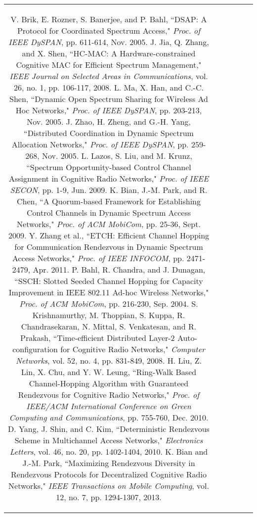 \documentclass[journal]{IEEEtran}
\begin{document}
\begin{table*}
\begin{tabular}{|c|c|c|c|c|c|}
{\begin{thebibliography}{1}
\bibitem{IEEEhowto:kopka}
V. Brik, E. Rozner, S. Banerjee, and P. Bahl, ``DSAP: A Protocol for Coordinated Spectrum Access," \emph{Proc. of IEEE DySPAN}, pp. 611-614, Nov. 2005.
\bibitem{IEEEhowto:kopka}
J. Jia, Q. Zhang, and X. Shen, ``HC-MAC: A Hardware-constrained Cognitive MAC for Efficient Spectrum Management," \emph{IEEE Journal on Selected Areas in Communications}, vol. 26, no. 1, pp. 106-117, 2008.
\bibitem{IEEEhowto:kopka}
L. Ma, X. Han, and C.-C. Shen, ``Dynamic Open Spectrum Sharing for Wireless Ad Hoc Networks," \emph{Proc. of IEEE DySPAN}, pp. 203-213, Nov. 2005.
\bibitem{IEEEhowto:kopka}
J. Zhao, H. Zheng, and G.-H. Yang, ``Distributed Coordination in Dynamic Spectrum Allocation Networks," \emph{Proc. of IEEE DySPAN}, pp. 259-268, Nov. 2005.
\bibitem{IEEEhowto:kopka}
L. Lazos, S. Liu, and M. Krunz, ``Spectrum Opportunity-based Control Channel Assignment in Cognitive Radio Networks," \emph{Proc. of IEEE SECON}, pp. 1-9, Jun. 2009.
\bibitem{IEEEhowto:kopka}
K. Bian, J.-M. Park, and R. Chen, ``A Quorum-based Framework for Establishing Control Channels in Dynamic Spectrum Access Networks," \emph{Proc. of ACM MobiCom}, pp. 25-36, Sept. 2009.
\bibitem{IEEEhowto:kopka}
Y. Zhang et al., ``ETCH: Efficient Channel Hopping for Communication Rendezvous in Dynamic Spectrum Access Networks," \emph{Proc. of IEEE INFOCOM}, pp. 2471-2479, Apr. 2011.
\bibitem{IEEEhowto:kopka}
P. Bahl, R. Chandra, and J. Dunagan, ``SSCH: Slotted Seeded Channel Hopping for Capacity Improvement in IEEE 802.11 Ad-hoc Wireless Networks," \emph{Proc. of ACM MobiCom}, pp. 216-230, Sep. 2004.
\bibitem{IEEEhowto:kopka}
S. Krishnamurthy, M. Thoppian, S. Kuppa, R. Chandrasekaran, N. Mittal, S. Venkatesan, and R. Prakash, ``Time-efficient Distributed Layer-2 Auto-configuration for Cognitive Radio Networks," \emph{Computer Networks}, vol. 52, no. 4, pp. 831-849, 2008.
\bibitem{IEEEhowto:kopka}
H. Liu,  Z. Lin,  X. Chu, and Y. W. Leung, ``Ring-Walk Based Channel-Hopping Algorithm with Guaranteed Rendezvous for Cognitive Radio Networks," \emph{Proc. of IEEE/ACM International Conference on Green Computing and Communications}, pp. 755-760, Dec. 2010.
\bibitem{IEEEhowto:kopka}
D. Yang, J. Shin, and C. Kim, ``Deterministic Rendezvous Scheme in Multichannel Access Networks," \emph{Electronics Letters}, vol. 46, no. 20, pp. 1402-1404, 2010.
\bibitem{IEEEhowto:kopka}
K. Bian and J.-M. Park, ``Maximizing Rendezvous Diversity in Rendezvous Protocols for Decentralized Cognitive Radio Networks," \emph{IEEE Transactions on Mobile Computing}, vol. 12, no. 7, pp. 1294-1307, 2013.
\bibitem{IEEEhowto:kopka}

\end{thebibliography}}
\end{tabular}
\end{table*}
\end{document}
